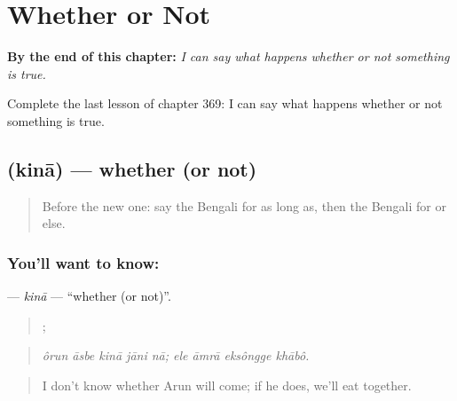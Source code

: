 
\chapter{Whether or Not}
\label{ch:bn-whether-or-not}

\begin{chapteropening}
\textbf{By the end of this chapter:} \emph{I can say what happens whether or not something is true.}

Complete the last lesson of chapter 369: I can say what happens whether or not something is true.
\end{chapteropening}

\section[\texorpdfstring{\bn{কিনা} (kinā)}{কিনা (kinā)}]{ (kinā) — whether (or not)}

\label{lesson:BN-C369-kina}



\begin{quote}
Before the new one: say the Bengali for as long as, then the Bengali for or else.
\end{quote}

\subsection*{You'll want to know: }
\textbf{} — \emph{kinā} — \textquotedblleft{}whether (or not)\textquotedblright{}.

\begin{quote}
    ;    
\end{quote}

\begin{quote}
\emph{ôrun āsbe kinā jāni nā; ele āmrā eksôngge khābô.}
\end{quote}

\begin{quote}
I don't know whether Arun will come; if he does, we'll eat together.
\end{quote}

